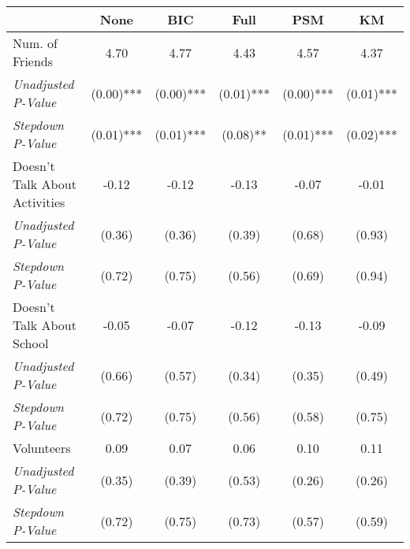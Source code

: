 \begin{tabular}{l c c c c c}
\toprule
 & None & BIC & Full & PSM & KM \\
\midrule
Num. of Friends & 4.70 & 4.77 & 4.43 & 4.57 & 4.37 \\
\quad \textit{Unadjusted P-Value} & (0.00)*** & (0.00)*** & (0.01)*** & (0.00)*** & (0.01)*** \\
\quad \textit{Stepdown P-Value} & (0.01)*** & (0.01)*** & (0.08)** & (0.01)*** & (0.02)*** \\
Doesn't Talk About Activities & -0.12 & -0.12 & -0.13 & -0.07 & -0.01 \\
\quad \textit{Unadjusted P-Value} & (0.36) & (0.36) & (0.39) & (0.68) & (0.93) \\
\quad \textit{Stepdown P-Value} & (0.72) & (0.75) & (0.56) & (0.69) & (0.94) \\
Doesn't Talk About School & -0.05 & -0.07 & -0.12 & -0.13 & -0.09 \\
\quad \textit{Unadjusted P-Value} & (0.66) & (0.57) & (0.34) & (0.35) & (0.49) \\
\quad \textit{Stepdown P-Value} & (0.72) & (0.75) & (0.56) & (0.58) & (0.75) \\
Volunteers & 0.09 & 0.07 & 0.06 & 0.10 & 0.11 \\
\quad \textit{Unadjusted P-Value} & (0.35) & (0.39) & (0.53) & (0.26) & (0.26) \\
\quad \textit{Stepdown P-Value} & (0.72) & (0.75) & (0.73) & (0.57) & (0.59) \\
\bottomrule
\end{tabular}
